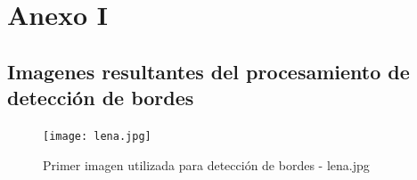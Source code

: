 \documentclass[11pt, a4paper]{article}
\begin{document}
\newpage
\section{Anexo I}
\subsection{Imagenes resultantes del procesamiento de detecci\'on de bordes}

\vspace{2cm}

\begin{figure}[ht] %
\centering
\texttt{[image: lena.jpg]}
\caption{Primer imagen utilizada para detecci\'on de bordes - lena.jpg}
\end{figure}

\vspace{3cm}
\end{document}
